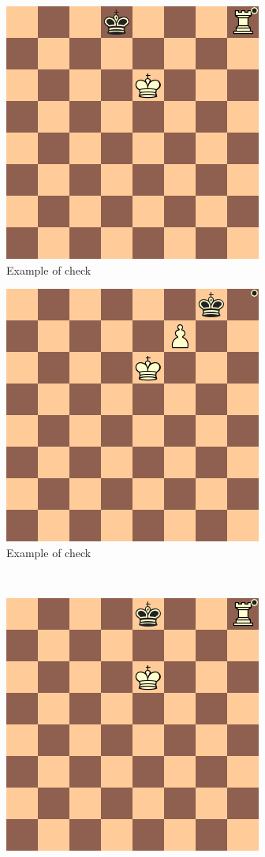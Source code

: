 \begin{figure}
    \centering
    \begin{subfigure}[b]{0.4\textwidth}
        \includegraphics[scale=0.5]{fig/rules/check1}
        \caption{Example of check}
        \label{fig:check1}
    \end{subfigure}
    \qquad
    \begin{subfigure}[b]{0.4\textwidth}
         \includegraphics[scale=0.5]{fig/rules/check2}
        \caption{Example of check}
        \label{fig:check2}
    \end{subfigure}
    \\
    \begin{subfigure}[b]{0.4\textwidth}
        \includegraphics[scale=0.5]{fig/rules/mate1}

\end{subfigure}
\end{figure}
